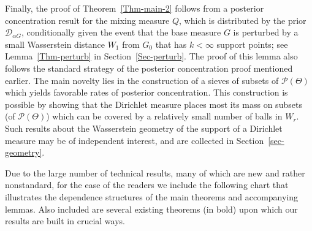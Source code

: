 \documentclass[MSNbibl,number,citesort]{arxbj}
\newcommand{\Pcal}{\mathscr{P}}
\newcommand{\DP}{\mathscr{D}}
\newcommand{\Wr}{W_r}
\begin{document}
Finally, the proof of Theorem~\ref{Thm-main-2} follows from a posterior
concentration result for the mixing measure $Q$, which
is distributed by the prior $\DP_{\alpha G}$, conditionally given
the event that the base measure $G$ is perturbed by a small Wasserstein
distance $W_1$ from $G_0$ that has $k < \infty$ support points;
see Lemma~\ref{Thm-perturb} in Section~\ref{Sec-perturb}.
The proof of this lemma also follows the standard strategy
of the posterior concentration proof mentioned earlier. The main
novelty lies in the construction of a sieves of subsets of
$\Pcal(\Theta)$ which yields favorable rates of posterior
concentration. This construction is possible by showing
that the Dirichlet measure
places most its mass on subsets (of $\Pcal(\Theta)$) which can be
covered by a relatively small number of balls in $\Wr$.
Such results about the Wasserstein geometry of
the support of a Dirichlet measure may be of independent interest,
and are collected in Section~\ref{sec-geometry}.

Due to the large number of technical results, many of which
are new and rather nonstandard,
for the ease of the readers we
include the following chart that illustrates the dependence
structures of the main theorems and accompanying lemmas.
Also included are several existing theorems (in bold) upon which
our results are built in crucial ways.
\end{document}
